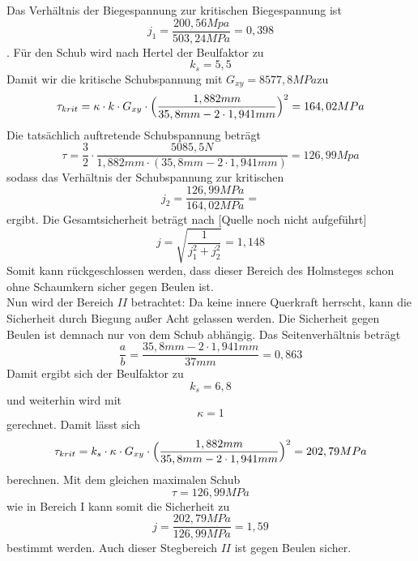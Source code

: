 Das Verhältnis der Biegespannung zur kritischen Biegespannung ist
\begin{equation}
	j_{1}=\frac{200,56 Mpa}{503,24MPa}=0,398
\end{equation}. Für den Schub wird nach Hertel der Beulfaktor zu
\begin{equation}
	k_{s}=5,5
\end{equation}
Damit wir die kritische Schubspannung mit $G_{xy}=8577,8MPa$zu 
\begin{equation}
	\tau_{krit}=\kappa\cdot k\cdot G_{xy}\cdot\Bigl(\frac{1,88 2mm}{35,8 mm - 2\cdot 1,941  mm}\Bigr)^{2}=164,02 MPa
\end{equation}
Die tatsächlich auftretende Schubspannung beträgt 
\begin{equation}
	\tau=\frac{3}{2}\cdot \frac{5085,5 N}{1,882 mm\cdot(35,8 mm-2\cdot 1,941 mm)}=126,99 Mpa
\end{equation}
sodass das Verhältnis der Schubspannung zur kritischen 
\begin{equation}
	j_{2}=\frac{126,99 MPa}{164,02 MPa}=
\end{equation}
ergibt. Die Gesamtsicherheit beträgt nach [Quelle noch nicht aufgeführt]
\begin{equation}
	j=\sqrt{\frac{1}{j_{1}^{2}+j_{2}^{2}}}=1,148
\end{equation}
Somit kann rückgeschlossen werden, dass dieser Bereich des Holmsteges schon ohne Schaumkern sicher gegen Beulen ist.\\

\noindent Nun wird der Bereich $II$ betrachtet:
Da keine innere Querkraft herrscht, kann die Sicherheit durch Biegung außer Acht gelassen werden. Die Sicherheit gegen Beulen ist demnach nur von dem Schub abhängig.
Das Seitenverhältnis beträgt 
\begin{equation}
	\frac{a}{b}=\frac{35,8mm - 2\cdot 1,941mm}{37mm}=0,863
\end{equation}
Damit ergibt sich der Beulfaktor zu 
\begin{equation}
	k_{s}=6,8
\end{equation}
und weiterhin wird mit 
\begin{equation}
	\kappa = 1 
\end{equation}
gerechnet. Damit lässt sich 
\begin{equation}
	 \tau_{krit} = k_{s}\cdot \kappa\cdot G_{xy}\cdot \Bigl(\frac{1,882mm}{35,8mm-2\cdot 1,941mm}\Bigr)^{2}= 202,79 MPa
\end{equation}
berechnen. Mit dem gleichen maximalen Schub
\begin{equation}
	\tau=126,99 MPa
\end{equation}
 wie in Bereich I kann somit die Sicherheit zu 
 \begin{equation}
 	j=\frac{202,79MPa}{126,99MPa}=1,59
 \end{equation}
bestimmt werden. Auch dieser Stegbereich $II$ ist gegen Beulen sicher.\\

